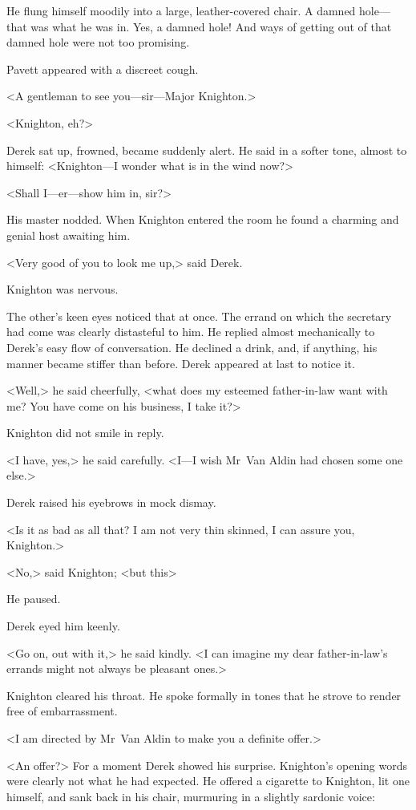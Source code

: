 He flung himself moodily into a large, leather-covered chair. A damned hole—that was what he was in. Yes, a damned hole! And ways of getting out of that damned hole were not too promising.

Pavett appeared with a discreet cough.

<A gentleman to see you—sir—Major Knighton.>

<Knighton, eh?>

Derek sat up, frowned, became suddenly alert. He said in a softer tone, almost to himself: <Knighton—I wonder what is in the wind now?>

<Shall I—er—show him in, sir?>

His master nodded. When Knighton entered the room he found a charming and genial host awaiting him.

<Very good of you to look me up,> said Derek.

Knighton was nervous.

The other's keen eyes noticed that at once. The errand on which the secretary had come was clearly distasteful to him. He replied almost mechanically to Derek's easy flow of conversation. He declined a drink, and, if anything, his manner became stiffer than before. Derek appeared at last to notice it.

<Well,> he said cheerfully, <what does my esteemed father-in-law want with me? You have come on his business, I take it?>

Knighton did not smile in reply.

<I have, yes,> he said carefully. <I—I wish Mr~Van Aldin had chosen some one else.>

Derek raised his eyebrows in mock dismay.

<Is it as bad as all that? I am not very thin skinned, I can assure you, Knighton.>

<No,> said Knighton; <but this\longdash>

He paused.

Derek eyed him keenly.

<Go on, out with it,> he said kindly. <I can imagine my dear father-in-law's errands might not always be pleasant ones.>

Knighton cleared his throat. He spoke formally in tones that he strove to render free of embarrassment.

<I am directed by Mr~Van Aldin to make you a definite offer.>

<An offer?> For a moment Derek showed his surprise. Knighton's opening words were clearly not what he had expected. He offered a cigarette to Knighton, lit one himself, and sank back in his chair, murmuring in a slightly sardonic voice:

